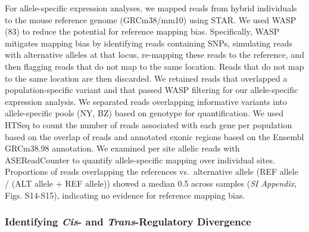 \documentclass[9pt,twocolumn,twoside,lineno]{pnas-new}
\begin{document}
For allele-specific expression analyses, we mapped reads from hybrid
individuals to the mouse reference genome (GRCm38/mm10) using STAR. We
used WASP (83) to reduce the potential for reference mapping bias.
Specifically, WASP mitigates mapping bias by identifying reads
containing SNPs, simulating reads with alternative alleles at that
locus, re-mapping these reads to the reference, and then flagging reads
that do not map to the same location. Reads that do not map to the same
location are then discarded. We retained reads that overlapped a
population-specific variant and that passed WASP filtering for our
allele-specific expression analysis. We separated reads overlapping
informative variants into allele-specific pools (NY, BZ) based on
genotype for quantification. We used HTSeq to count the number of reads
associated with each gene per population based on the overlap of reads
and annotated exonic regions based on the Ensembl GRCm38.98 annotation.
We examined per site allelic reads with ASEReadCounter to quantify
allele-specific mapping over individual sites. Proportions of reads
overlapping the references vs.~alternative allele (REF allele / (ALT
allele + REF allele)) showed a median 0.5 across samples (\emph{SI
Appendix}, Figs. S14-S15), indicating no evidence for reference mapping
bias.

\hypertarget{identifying-cis-and-trans-regulatory-divergene}{%
\subsubsection*{\texorpdfstring{Identifying \emph{Cis}- and
\emph{Trans}-Regulatory
Divergence}{Identifying Cis- and Trans-Regulatory Divergence}}\label{identifying-cis-and-trans-regulatory-divergene}}
\end{document}

